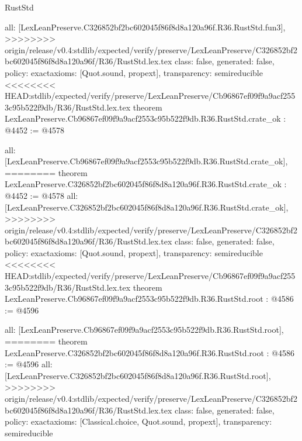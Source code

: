 \begin{lexlean}{RustStd}
\begin{coremodule}
{\begin{coremodule}
{{{{{{{  all: [LexLeanPreserve.C326852bf2bc602045f86f8d8a120a96f.R36.RustStd.fun3],
>>>>>>>> origin/release/v0.4:stdlib/expected/verify/preserve/LexLeanPreserve/C326852bf2bc602045f86f8d8a120a96f/R36/RustStd.lex.tex
  class: false,
  generated: false,
  policy: exact{axioms: [Quot.sound, propext]},
  transparency: semireducible
}
<<<<<<<< HEAD:stdlib/expected/verify/preserve/LexLeanPreserve/Cb96867ef09f9a9acf2553c95b522f9db/R36/RustStd.lex.tex
theorem LexLeanPreserve.Cb96867ef09f9a9acf2553c95b522f9db.R36.RustStd.crate_ok : @4452 := @4578 {
  all: [LexLeanPreserve.Cb96867ef09f9a9acf2553c95b522f9db.R36.RustStd.crate_ok],
========
theorem LexLeanPreserve.C326852bf2bc602045f86f8d8a120a96f.R36.RustStd.crate_ok : @4452 := @4578 {
  all: [LexLeanPreserve.C326852bf2bc602045f86f8d8a120a96f.R36.RustStd.crate_ok],
>>>>>>>> origin/release/v0.4:stdlib/expected/verify/preserve/LexLeanPreserve/C326852bf2bc602045f86f8d8a120a96f/R36/RustStd.lex.tex
  class: false,
  generated: false,
  policy: exact{axioms: [Quot.sound, propext]},
  transparency: semireducible
}
<<<<<<<< HEAD:stdlib/expected/verify/preserve/LexLeanPreserve/Cb96867ef09f9a9acf2553c95b522f9db/R36/RustStd.lex.tex
theorem LexLeanPreserve.Cb96867ef09f9a9acf2553c95b522f9db.R36.RustStd.root : @4586 := @4596 {
  all: [LexLeanPreserve.Cb96867ef09f9a9acf2553c95b522f9db.R36.RustStd.root],
========
theorem LexLeanPreserve.C326852bf2bc602045f86f8d8a120a96f.R36.RustStd.root : @4586 := @4596 {
  all: [LexLeanPreserve.C326852bf2bc602045f86f8d8a120a96f.R36.RustStd.root],
>>>>>>>> origin/release/v0.4:stdlib/expected/verify/preserve/LexLeanPreserve/C326852bf2bc602045f86f8d8a120a96f/R36/RustStd.lex.tex
  class: false,
  generated: false,
  policy: exact{axioms: [Classical.choice, Quot.sound, propext]},
  transparency: semireducible
}

}}}}}}}}
\end{coremodule}}
\end{coremodule}
\end{lexlean}
